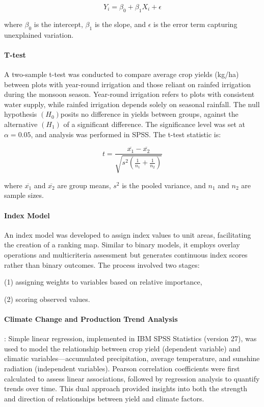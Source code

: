 \[
Y_i = \beta_0 + \beta_1 X_i + \epsilon
\]

where $\beta_0$ is the intercept, $\beta_1$ is the slope, and $\epsilon$ is the error term capturing unexplained variation.

\paragraph{T-test}
A two-sample t-test was conducted to compare average crop yields (kg/ha) between plots with year-round irrigation and those reliant on rainfed irrigation during the monsoon season. Year-round irrigation refers to plots with consistent water supply, while rainfed irrigation depends solely on seasonal rainfall. The null hypothesis $(H_0) $posits no difference in yields between groups, against the alternative $(H_1)$ of a significant difference. The significance level was set at $\alpha = 0.05$, and analysis was performed in SPSS.
The t-test statistic is:

\[
t = \frac{\overline{x_1} - \overline{x_2}}{\sqrt{s^2 \left( \frac{1}{n_1} + \frac{1}{n_2} \right)}}
\]

where $\overline{x_1}$ and $\overline{x_2}$ are group means, $s^2$ is the pooled variance, and $n_1$ and $n_2$ are sample sizes.

\paragraph{Index Model}  
An index model was developed to assign index values to unit areas, facilitating the creation of a ranking map. Similar to binary models, it employs overlay operations and multicriteria assessment but generates continuous index scores rather than binary outcomes.
The process involved two stages:

(1) assigning weights to variables based on relative importance, 

(2) scoring observed values.

\paragraph{Climate Change and Production Trend Analysis}  :
Simple linear regression, implemented in IBM SPSS Statistics (version 27), was used to model the relationship between crop yield (dependent variable) and climatic variables---accumulated precipitation, average temperature, and sunshine radiation (independent variables). Pearson correlation coefficients were first calculated to assess linear associations, followed by regression analysis to quantify trends over time. This dual approach provided insights into both the strength and direction of relationships between yield and climate factors.


